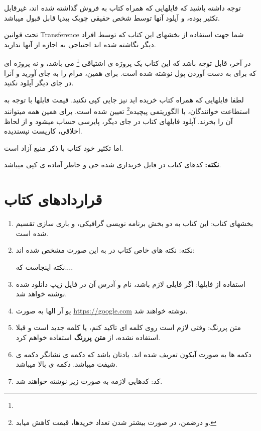 \documentclass[14pt,a4paper]{memoir}
\begin{document}
	 توجه داشته باشید که فایلهایی که همراه کتاب به فروش گذاشته شده اند، غیرقابل تکثیر بوده، و آپلود آنها توسط شخص حقیقی چوبک بیدپا قابل قبول میباشد.
	 
	 تحت قوانین Transference شما جهت استفاده از بخشهای این کتاب که توسط افراد دیگر نگاشته شده اند احتیاجی به اجازه از آنها ندارید.
	 
	 در آخر، قابل توجه باشد که این کتاب یک پروژه ی اشتیاقی \footnote{} می باشد، و نه پروژه ای که برای به دست آوردن پول نوشته شده است. برای همین، مرام را به جای آورید و آنرا در جای دیگر آپلود نکنید.
	 
	 لطفا فایلهایی که همراه کتاب خریده اید نیز جایی کپی نکنید. قیمت فایلها با توجه به استطاعت خوانندگان، با الگوریتمی پیچیده\footnote{و درضمن، در صورت بیشتر شدن تعداد خریدها، قیمت کاهش میابد.} تعیین شده است. برای همین همه میتوانند آن را بخرند. آپلود فایلهای کتاب در جای دیگر، پایرسی حساب میشود و از لحاظ اخلاقی، کاریست نپسندیده.
	 
	 اما تکثیر خود کتاب با ذکر منبع آزاد است.
	  
	 \textbf{نکته:} کدهای کتاب در فایل خریداری شده حی و حاظر آماده ی کپی میباشد.
	 
	 
	 
	 \chapter*{قراردادهای کتاب}
	 
	 \begin{enumerate}
	 	\item  بخشهای کتاب: این کتاب به دو بخش برنامه نویسی گرافیکی، و بازی سازی تقسیم شده است.
	 	\item  نکته: نکته های خاص کتاب در به این صورت مشخص شده اند:
	 		
	 	
	 				\begin{tip}
	 					نکته اینجاست که....
	 				\end{tip}
	 
	 \item استفاده از فایلها: اگر فایلی لازم باشد، نام و آدرس آن در فایل زیپ دانلود شده نوشته خواهد شد.
	 \item یو آر الها به صورت \url{https://google.com} نوشته خواهند شد.
	 \item متن پررنگ: وقتی لازم است روی کلمه ای تاکید کنم، یا کلمه جدید است و قبلا استفاده نشده، از \textbf{متن پررنگ} استفاده خواهم کرد.
	 \item  دکمه ها به صورت آیکون تعریف شده اند. یادتان باشد که دکمه ی \keys{\shift} نشانگر دکمه ی شیفت میباشد. دکمه ی بالا \keys{$\uparrow$} میباشد.
	 \item کد: کدهایی لازمه به صورت زیر نوشته خواهند شد.
	 
	 
	\begin{latin}
	
	\end{latin}
	 
	\end{enumerate}
	 
\end{document}
